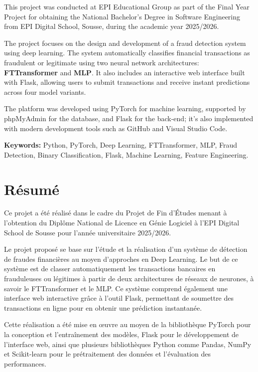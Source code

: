 \documentclass[12pt,a4paper,twoside]{report}
\begin{document}
This project was conducted at EPI Educational Group as part of the Final Year Project for obtaining the National Bachelor's Degree in Software Engineering from EPI Digital School, Sousse, during the academic year 2025/2026.

The project focuses on the design and development of a fraud detection system using deep learning. The system automatically classifies financial transactions as fraudulent or legitimate using two neural network architectures: \textbf{FTTransformer} and \textbf{MLP}. It also includes an interactive web interface built with Flask, allowing users to submit transactions and receive instant predictions across four model variants.

The platform was developed using PyTorch for machine learning, supported by phpMyAdmin for the database, and Flask for the back-end; it's also implemented with modern development tools such as GitHub and Visual Studio Code.

\vspace{1cm}

\noindent \textbf{Keywords:} Python, PyTorch, Deep Learning, FTTransformer, MLP, Fraud Detection, Binary Classification, Flask, Machine Learning, Feature Engineering.

\chapter*{Résumé}

Ce projet a été réalisé dans le cadre du Projet de Fin d'Études menant à l'obtention du Diplôme National de Licence en Génie Logiciel à l'EPI Digital School de Sousse pour l'année universitaire 2025/2026.

Le projet proposé se base sur l'étude et la réalisation d'un système de détection de fraudes financières au moyen d'approches en Deep Learning. Le but de ce système est de classer automatiquement les transactions bancaires en frauduleuses ou légitimes à partir de deux architectures de réseaux de neurones, à savoir le FTTransformer et le MLP. Ce système comprend également une interface web interactive grâce à l'outil Flask, permettant de soumettre des transactions en ligne pour en obtenir une prédiction instantanée.

Cette réalisation a été mise en œuvre au moyen de la bibliothèque PyTorch pour la conception et l'entraînement des modèles, Flask pour le développement de l'interface web, ainsi que plusieurs bibliothèques Python comme Pandas, NumPy et Scikit-learn pour le prétraitement des données et l'évaluation des performances.
\end{document}
